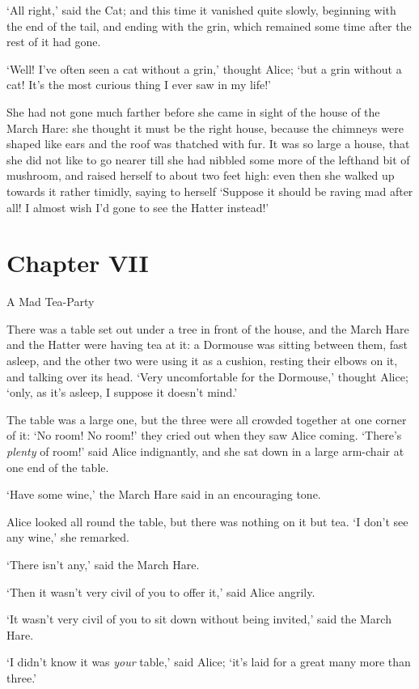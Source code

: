   `All right,' said the Cat; and this time it vanished quite slowly,
beginning with the end of the tail, and ending with the grin,
which remained some time after the rest of it had gone.

  `Well!  I've often seen a cat without a grin,' thought Alice;
`but a grin without a cat!  It's the most curious thing I ever
saw in my life!'

  She had not gone much farther before she came in sight of the
house of the March Hare:  she thought it must be the right house,
because the chimneys were shaped like ears and the roof was
thatched with fur.  It was so large a house, that she did not
like to go nearer till she had nibbled some more of the lefthand
bit of mushroom, and raised herself to about two feet high:  even
then she walked up towards it rather timidly, saying to herself
`Suppose it should be raving mad after all!  I almost wish I'd
gone to see the Hatter instead!'



\chapter{Chapter VII}{A Mad Tea-Party}


  There was a table set out under a tree in front of the house,
and the March Hare and the Hatter were having tea at it:  a
Dormouse was sitting between them, fast asleep, and the other two
were using it as a cushion, resting their elbows on it, and talking
over its head.  `Very uncomfortable for the Dormouse,' thought Alice;
`only, as it's asleep, I suppose it doesn't mind.'

  The table was a large one, but the three were all crowded
together at one corner of it:  `No room!  No room!' they cried
out when they saw Alice coming.  `There's {\it plenty} of room!' said
Alice indignantly, and she sat down in a large arm-chair at one
end of the table.

  `Have some wine,' the March Hare said in an encouraging tone.

  Alice looked all round the table, but there was nothing on it
but tea.  `I don't see any wine,' she remarked.

  `There isn't any,' said the March Hare.

  `Then it wasn't very civil of you to offer it,' said Alice
angrily.

  `It wasn't very civil of you to sit down without being
invited,' said the March Hare.

  `I didn't know it was {\it your} table,' said Alice; `it's laid for a
great many more than three.'

